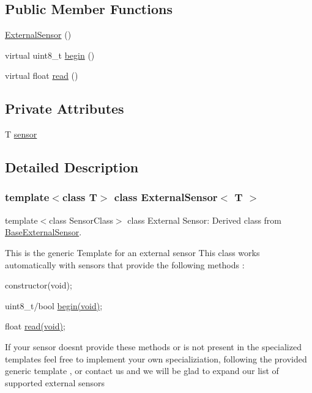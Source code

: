 \subsection*{Public Member Functions}
\begin{DoxyCompactItemize}
\item 
\hyperlink{class_external_sensor_a8b991447fba33253103d06198b838751}{External\+Sensor} ()
\item 
virtual uint8\+\_\+t \hyperlink{class_external_sensor_ab6fe1379d55b656a048e0fba1e0a32e6}{begin} ()
\item 
virtual float \hyperlink{class_external_sensor_a5fb3afc7d244fb86dac68ab5481bc407}{read} ()
\end{DoxyCompactItemize}
\subsection*{Private Attributes}
\begin{DoxyCompactItemize}
\item 
T \hyperlink{class_external_sensor_a6e1f518119abe08c14b498ce24a7e1b3}{sensor}
\end{DoxyCompactItemize}


\subsection{Detailed Description}
\subsubsection*{template$<$class T$>$\newline
class External\+Sensor$<$ T $>$}

template$<$class Sensor\+Class$>$ class External Sensor\+: Derived class from \hyperlink{class_base_external_sensor}{Base\+External\+Sensor}. 

This is the generic Template for an external sensor This class works automatically with sensors that provide the following methods \+:
\begin{DoxyItemize}
\item constructor(void);
\item uint8\+\_\+t/bool \hyperlink{class_external_sensor_ab6fe1379d55b656a048e0fba1e0a32e6}{begin(void)};
\item float \hyperlink{class_external_sensor_a5fb3afc7d244fb86dac68ab5481bc407}{read(void)};
\end{DoxyItemize}

If your sensor doesn\textquotesingle{}t provide these methods or is not present in the specialized templates feel free to implement your own specializiation, following the provided generic template , or contact us and we will be glad to expand our list of supported external sensors 

